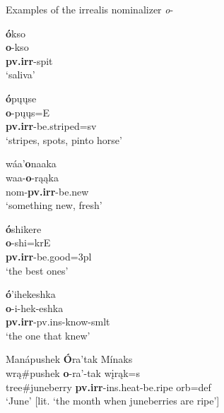 \begin{exe}

\item\label{NOMirrealisEx} Examples of the irrealis nominalizer \textit{o}-

    \begin{xlist}
    
    \item\label{NOMirrealisEx1} \glll \textbf{ó}kso\\
    \textbf{o}-kso\\
    \textbf{pv.irr}-\textnormal{spit}\\
    \glt `saliva' \citep[121]{hollow1970}
    
    \item\label{NOMirrealisEx2} \glll \textbf{ó}pųųse\\
    \textbf{o}-pųųs=E\\
    \textbf{pv.irr}-\textnormal{be.striped}=sv\\
    \glt `stripes, spots, pinto horse' \citep[160]{hollow1970}
    
    \item\label{NOMirrealisEx3} \glll wáa'\textbf{o}naaka\\
    waa-\textbf{o}-rąąka\\
    nom-\textbf{pv.irr}-\textnormal{be.new}\\
    \glt `something new, fresh' \citep[165]{hollow1970}
    
    \item\label{NOMirrealisEx4} \glll \textbf{ó}shikere\\
    \textbf{o}-shi=krE\\
    \textbf{pv.irr}-\textnormal{be.good}=3pl\\
    \glt `the best ones' \citep[252]{hollow1973b}
    
    \item\label{NOMirrealisEx5} \glll \textbf{ó}'ihekeshka\\
    \textbf{o}-i-hek-eshka\\
    \textbf{pv.irr}-pv.ins-\textnormal{know}-smlt\\
    \glt `the one that knew' \citep[257]{hollow1973b}
    
    \item\label{NOMirrealisEx6} \glll  Manápushek \textbf{Ó}ra'tak Mínaks\\
    wrą\#pushek \textbf{o}-ra'-tak wįrąk=s\\
    \textnormal{tree}\#\textnormal{juneberry} \textbf{pv.irr}-ins.heat-\textnormal{be.ripe} \textnormal{orb}=def\\
    \glt `June' [lit. `the month when juneberries are ripe'] \citep[161]{hollow1970}
    
    \end{xlist}

\end{exe}

